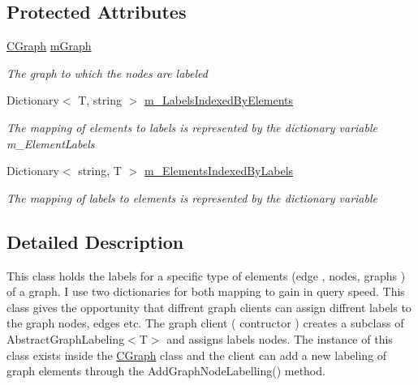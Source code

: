 \subsection*{Protected Attributes}
\begin{DoxyCompactItemize}
\item 
\hyperlink{class_graph_library_1_1_c_graph}{C\+Graph} \hyperlink{class_graph_library_1_1_abstract_graph_labeling_a1e6a6965cad4151fc87e0dd1c3ceb3bf}{m\+Graph}
\begin{DoxyCompactList}\small\item\em The graph to which the nodes are labeled \end{DoxyCompactList}\item 
Dictionary$<$ T, string $>$ \hyperlink{class_graph_library_1_1_abstract_graph_labeling_aabc5cd0829948a4a760852dd60b3fc2d}{m\+\_\+\+Labels\+Indexed\+By\+Elements}
\begin{DoxyCompactList}\small\item\em The mapping of elements to labels is represented by the dictionary variable m\+\_\+\+Element\+Labels \end{DoxyCompactList}\item 
Dictionary$<$ string, T $>$ \hyperlink{class_graph_library_1_1_abstract_graph_labeling_ae28de1e7750fad591ff317f9d51e88bb}{m\+\_\+\+Elements\+Indexed\+By\+Labels}
\begin{DoxyCompactList}\small\item\em The mapping of labels to elements is represented by the dictionary variable \end{DoxyCompactList}\end{DoxyCompactItemize}


\subsection{Detailed Description}
This class holds the labels for a specific type of elements (edge , nodes, graphs ) of a graph. I use two dictionaries for both mapping to gain in query speed. This class gives the opportunity that diffrent graph clients can assign diffrent labels to the graph nodes, edges etc. The graph client ( contructor ) creates a subclass of Abstract\+Graph\+Labeling$<$\+T$>$ and assigns labels nodes. The instance of this class exists inside the \hyperlink{class_graph_library_1_1_c_graph}{C\+Graph} class and the client can add a new labeling of graph elements through the Add\+Graph\+Node\+Labelling() method. 


